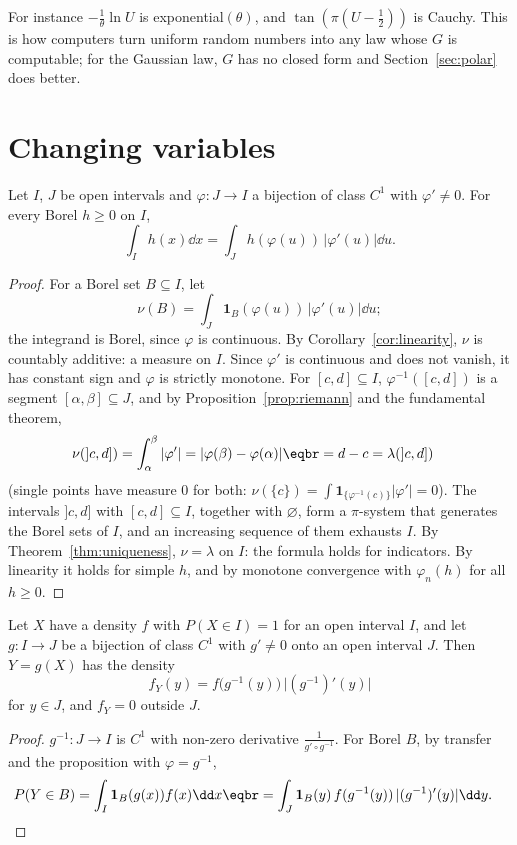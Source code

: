 For instance $-\frac1\theta\ln U$ is exponential$(\theta)$, and $\tan(\pi(U-\frac12))$ is Cauchy. This is how computers turn uniform random numbers
into any law whose $G$ is computable; for the Gaussian law, $G$ has no closed form and Section~\ref{sec:polar} does better.

\section{Changing variables}

\begin{proposition}\label{prop:cov}
Let $I$, $J$ be open intervals and $\varphi:J\to I$ a bijection of class $C^1$ with $\varphi'\ne0$. For every Borel $h\ge0$ on $I$,
\[
\int_Ih(x)\dd x=\int_Jh(\varphi(u))\,|\varphi'(u)|\dd u.
\]
\end{proposition}
\begin{proof}
For a Borel set $B\subseteq I$, let
\[
\nu(B)=\int_J\mathbf 1_B(\varphi(u))\,|\varphi'(u)|\dd u;
\]
the integrand is Borel, since $\varphi$ is continuous. By
Corollary~\ref{cor:linearity}, $\nu$ is countably additive: a measure on $I$. Since $\varphi'$ is continuous and does not vanish, it has
constant sign and $\varphi$ is strictly monotone. For $[c,d]\subseteq I$, $\varphi^{-1}([c,d])$ is a segment $[\alpha,\beta]\subseteq J$, and by
Proposition~\ref{prop:riemann} and the fundamental theorem,
\[
\begin{aligned}\nu(]c,d])&=\int_\alpha^\beta|\varphi'|=|\varphi(\beta)-\varphi(\alpha)|\eqbr=d-c=\lambda(]c,d])\end{aligned}
\]
(single points have measure $0$ for both: $\nu(\{c\})=\int\mathbf 1_{\{\varphi^{-1}(c)\}}|\varphi'|=0$). The intervals $]c,d]$ with $[c,d]\subseteq I$, together with $\varnothing$, form a
$\pi$-system that generates the Borel sets of $I$, and an increasing sequence of them exhausts $I$. By Theorem~\ref{thm:uniqueness},
$\nu=\lambda$ on $I$: the formula holds for indicators. By linearity it holds for simple $h$, and by monotone convergence
with $\varphi_n(h)$ for all $h\ge0$.
\end{proof}

\begin{corollary}[density of $g(X)$]\label{cor:densityg}
Let $X$ have a density $f$ with $P(X\in I)=1$ for an open interval $I$, and let $g:I\to J$ be a bijection of class $C^1$ with $g'\ne0$
onto an open interval $J$. Then $Y=g(X)$ has the density
\[
f_Y(y)=f\bigl(g^{-1}(y)\bigr)\,\bigl|(g^{-1})'(y)\bigr|
\]
for $y\in J$, and $f_Y=0$ outside $J$.
\end{corollary}
\begin{proof}
$g^{-1}:J\to I$ is $C^1$ with non-zero derivative $\frac1{g'\circ g^{-1}}$. For Borel $B$, by transfer and the proposition with $\varphi=g^{-1}$,
\[
\begin{aligned}P(Y\in B)&=\int_I\mathbf 1_B(g(x))f(x)\dd x\eqbr=\int_J\mathbf 1_B(y)\,f(g^{-1}(y))\,|(g^{-1})'(y)|\dd y.\end{aligned}
\]
\end{proof}

